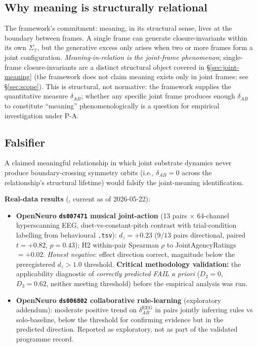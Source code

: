 \documentclass[11pt]{article}
\theoremstyle{plain}
\theoremstyle{definition}
\theoremstyle{remark}
\newcommand{\Ical}{\mathcal{I}}
\begin{document}
\subsection{Why meaning is structurally relational}

The framework's commitment: meaning, in its structural sense, lives at the boundary between frames. A single frame can generate closure-invariants within its own $\Sigma_\Ical$, but the generative excess only arises when two or more frames form a joint configuration. \emph{Meaning-in-relation is the joint-frame phenomenon}; single-frame closure-invariants are a distinct structural object covered in \S\ref{sec:joint-meaning} (the framework does not claim meaning exists only in joint frames; see \S\ref{sec:scope}). This is structural, not normative: the framework supplies the quantitative measure $\delta_{AB}$; whether any specific joint frame produces enough $\delta_{AB}$ to constitute ``meaning'' phenomenologically is a question for empirical investigation under P-A.

\subsection{Falsifier}

A claimed meaningful relationship in which joint substrate dynamics never produce boundary-crossing symmetry orbits (i.e., $\delta_{AB} = 0$ across the relationship's structural lifetime) would falsify the joint-meaning identification.

\textbf{Real-data results} (\citet{SolutionLab007}, current as of 2026-05-22):
\begin{itemize}[leftmargin=2em]
\item \textbf{OpenNeuro \texttt{ds007471} musical joint-action} (13 pairs × 64-channel hyperscanning EEG, duet-vs-constant-pitch contrast with trial-condition labelling from behavioural \texttt{.tsv}): $d_z = +0.23$ ($9/13$ pairs directional, paired $t = +0.82$, $p = 0.43$); H2 within-pair Spearman $\rho$ to JointAgencyRatings $= +0.02$. \emph{Honest negative}: effect direction correct, magnitude below the preregistered $d_z > 1.0$ threshold. \textbf{Critical methodology validation:} the applicability diagnostic of \citet{SmartClosureDistance} \emph{correctly predicted FAIL a priori} ($D_2 = 0$, $D_3 = 0.62$, neither meeting threshold) before the empirical analysis was run.
\item \textbf{OpenNeuro \texttt{ds006802} collaborative rule-learning} (exploratory addendum): moderate positive trend on $\delta_{AB}^{\mathrm{EEG}}$ in pairs jointly inferring rules vs solo-baseline, below the threshold for confirming evidence but in the predicted direction. Reported as exploratory, not as part of the validated programme record.
\end{itemize}
\end{document}
